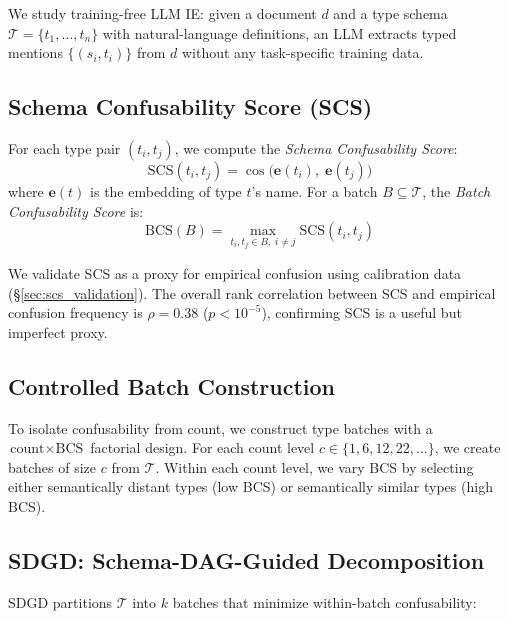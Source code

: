 \documentclass[11pt,a4paper]{article}
\begin{document}
We study training-free LLM IE: given a document $d$ and a type schema $\mathcal{T} = \{t_1, \ldots, t_n\}$ with natural-language definitions, an LLM extracts typed mentions $\{(s_i, t_i)\}$ from $d$ without any task-specific training data.

\subsection{Schema Confusability Score (SCS)}

For each type pair $(t_i, t_j)$, we compute the \emph{Schema Confusability Score}:
\begin{equation}
    \text{SCS}(t_i, t_j) = \cos\bigl(\mathbf{e}(t_i),\; \mathbf{e}(t_j)\bigr)
\end{equation}
where $\mathbf{e}(t)$ is the embedding of type $t$'s name. For a batch $B \subseteq \mathcal{T}$, the \emph{Batch Confusability Score} is:
\begin{equation}
    \text{BCS}(B) = \max_{t_i, t_j \in B,\; i \neq j} \text{SCS}(t_i, t_j)
\end{equation}

We validate SCS as a proxy for empirical confusion using calibration data (\S\ref{sec:scs_validation}). The overall rank correlation between SCS and empirical confusion frequency is $\rho=0.38$ ($p<10^{-5}$), confirming SCS is a useful but imperfect proxy.

\subsection{Controlled Batch Construction}

To isolate confusability from count, we construct type batches with a $\text{count} \times \text{BCS}$ factorial design. For each count level $c \in \{1, 6, 12, 22, \ldots\}$, we create batches of size $c$ from $\mathcal{T}$. Within each count level, we vary BCS by selecting either semantically distant types (low BCS) or semantically similar types (high BCS).

\subsection{SDGD: Schema-DAG-Guided Decomposition}
\label{sec:sdgd}

SDGD partitions $\mathcal{T}$ into $k$ batches that minimize within-batch confusability:
\end{document}
